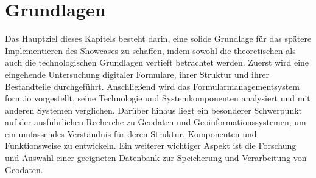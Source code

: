 \chapter{Grundlagen}

Das Hauptziel dieses Kapitels besteht darin, eine solide Grundlage für das spätere Implementieren des Showcases zu schaffen, indem sowohl die theoretischen als auch die technologischen Grundlagen vertieft betrachtet werden. Zuerst wird eine eingehende Untersuchung digitaler Formulare, ihrer Struktur und ihrer Bestandteile durchgeführt. Anschließend wird das Formularmanagementsystem form.io vorgestellt, seine Technologie und Systemkomponenten analysiert und mit anderen Systemen verglichen. Darüber hinaus liegt ein besonderer Schwerpunkt auf der ausführlichen Recherche zu Geodaten und Geoinformationssystemen, um ein umfassendes Verständnis für deren Struktur, Komponenten und Funktionsweise zu entwickeln. Ein weiterer wichtiger Aspekt ist die Forschung und Auswahl einer geeigneten Datenbank zur Speicherung und Verarbeitung von Geodaten.






